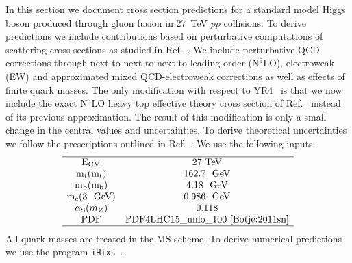 \label{sec:he-lhc-ggF}
In this section we document cross section predictions for a standard
model Higgs boson produced through gluon fusion in 27~TeV $pp$ collisions.  To
derive predictions we include contributions based on perturbative
computations of scattering cross sections as studied in
Ref.~\cite{Anastasiou:2016cez}.  We include perturbative QCD
corrections through next-to-next-to-next-to-leading order (N$^3$LO), electroweak (EW) and approximated mixed
QCD-electroweak corrections as well as effects of finite quark
masses. The only modification with respect to YR4~\cite{deFlorian:2016spz} is that we
now include the exact N$^3$LO heavy top effective theory cross section of
Ref.~\cite{Mistlberger:2018etf} instead of its previous approximation. The
result of this modification is only a small change in the central values and
uncertainties. To derive theoretical uncertainties we follow the
prescriptions outlined in Ref.~\cite{Anastasiou:2016cez}.
We use the following inputs:
\begin{equation}
\begin{array}{c  c}
\hline
\text{E}_\text{CM} & 27~\text{TeV} \\
\text{m}_\text{t}(\text{m}_\text{t}) & 162.7~\text{\ensuremath{~\text{GeV}}} \\
\text{m}_\text{b}(\text{m}_\text{b}) & 4.18~\text{\ensuremath{~\text{GeV}}} \\
\text{m}_\text{c}(3 \text{ \ensuremath{~\text{GeV}}}) & 0.986~\text{\ensuremath{~\text{GeV}}} \\
\alpha_\text{S} (m_Z) & 0.118  \\
\text{PDF} & \text{PDF4LHC15\_nnlo\_100}\text{~\cite{Botje:2011sn}}\\
\hline
\end{array}
\end{equation}
All quark masses are treated in the $\overline{\text{MS}}$ scheme. To derive numerical predictions we use the program \texttt{iHixs}~\cite{Dulat:2018rbf}.

